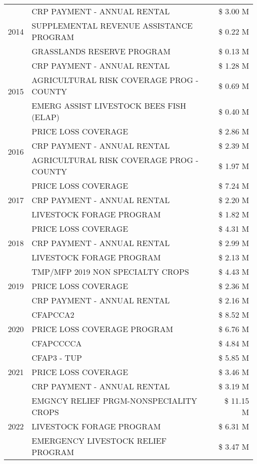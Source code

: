 \begin{tabular}{llr}
\cline{1-3}
\multirow[t]{3}{*}{2014} & CRP PAYMENT - ANNUAL RENTAL & \$ 3.00 M \\
 & SUPPLEMENTAL REVENUE ASSISTANCE PROGRAM & \$ 0.22 M \\
 & GRASSLANDS RESERVE PROGRAM & \$ 0.13 M \\
\cline{1-3}
\multirow[t]{3}{*}{2015} & CRP PAYMENT - ANNUAL RENTAL & \$ 1.28 M \\
 & AGRICULTURAL RISK COVERAGE PROG - COUNTY & \$ 0.69 M \\
 & EMERG ASSIST LIVESTOCK BEES FISH (ELAP) & \$ 0.40 M \\
\cline{1-3}
\multirow[t]{3}{*}{2016} & PRICE LOSS COVERAGE & \$ 2.86 M \\
 & CRP PAYMENT - ANNUAL RENTAL & \$ 2.39 M \\
 & AGRICULTURAL RISK COVERAGE PROG - COUNTY & \$ 1.97 M \\
\cline{1-3}
\multirow[t]{3}{*}{2017} & PRICE LOSS COVERAGE & \$ 7.24 M \\
 & CRP PAYMENT - ANNUAL RENTAL & \$ 2.20 M \\
 & LIVESTOCK FORAGE PROGRAM & \$ 1.82 M \\
\cline{1-3}
\multirow[t]{3}{*}{2018} & PRICE LOSS COVERAGE & \$ 4.31 M \\
 & CRP PAYMENT - ANNUAL RENTAL & \$ 2.99 M \\
 & LIVESTOCK FORAGE PROGRAM & \$ 2.13 M \\
\cline{1-3}
\multirow[t]{3}{*}{2019} & TMP/MFP 2019 NON SPECIALTY CROPS & \$ 4.43 M \\
 & PRICE LOSS COVERAGE & \$ 2.36 M \\
 & CRP PAYMENT - ANNUAL RENTAL & \$ 2.16 M \\
\cline{1-3}
\multirow[t]{3}{*}{2020} & CFAPCCA2 & \$ 8.52 M \\
 & PRICE LOSS COVERAGE PROGRAM & \$ 6.76 M \\
 & CFAPCCCCA & \$ 4.84 M \\
\cline{1-3}
\multirow[t]{3}{*}{2021} & CFAP3 - TUP & \$ 5.85 M \\
 & PRICE LOSS COVERAGE & \$ 3.46 M \\
 & CRP PAYMENT - ANNUAL RENTAL & \$ 3.19 M \\
\cline{1-3}
\multirow[t]{3}{*}{2022} & EMGNCY RELIEF PRGM-NONSPECIALITY CROPS & \$ 11.15 M \\
 & LIVESTOCK FORAGE PROGRAM & \$ 6.31 M \\
 & EMERGENCY LIVESTOCK RELIEF PROGRAM & \$ 3.47 M \\
\cline{1-3}
\bottomrule
\end{tabular}
